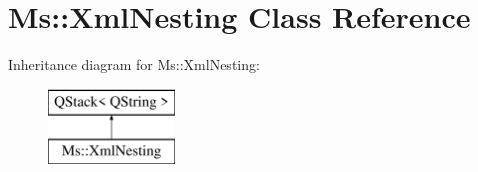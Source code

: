 \hypertarget{class_ms_1_1_xml_nesting}{}\section{Ms\+:\+:Xml\+Nesting Class Reference}
\label{class_ms_1_1_xml_nesting}
Inheritance diagram for Ms\+:\+:Xml\+Nesting\+:\begin{figure}[H]
\begin{center}
\leavevmode
\includegraphics[height=2.000000cm]{class_ms_1_1_xml_nesting}
\end{center}
\end{figure}

